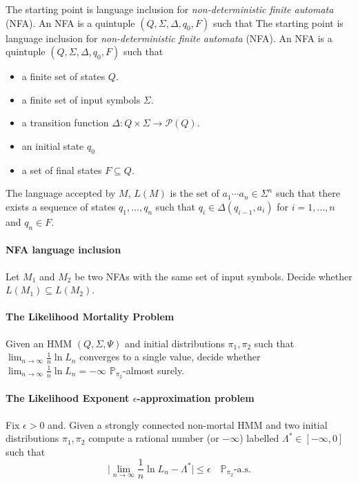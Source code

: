 \documentclass[a4paper,UKenglish,cleveref, autoref,mathscr]{lipics-v2019}
\newcommand{\PP}{\mathbb{P}}
\newcommand{\1}{\mathbbm{1}}
\newcommand{\liexp}{\lim_{n\rightarrow\infty} \frac1n \ln L_n}
\begin{document}
The starting point is language inclusion for \emph{non-deterministic finite automata} (NFA). An NFA is a quintuple $(Q,\Sigma ,\Delta ,q_0,F)$ such that
The starting point is language inclusion for \emph{non-deterministic finite automata} (NFA). An NFA is a quintuple $(Q,\Sigma ,\Delta ,q_0,F)$ such that
\begin{itemize}
\item a finite set of states $Q$.
\item a finite set of input symbols $\Sigma$.
\item a transition function $\Delta : Q \times \Sigma \rightarrow \mathscr{P}(Q)$.
\item an initial state $q_0$
\item a set of final states $F \subseteq Q$.
\end{itemize}
The language accepted by $M$, $L(M)$ is the set of $a_1\cdots a_n \in \Sigma^n$ such that there exists a sequence of states $q_1, \dots, q_n$ such that $q_i \in \Delta (q_{i - 1}, a_i)$ for $i = 1, \dots, n$ and $q_n \in F$.

\paragraph*{NFA language inclusion\\}
Let $M_1$ and $M_2$ be two NFAs with the same set of input symbols. Decide whether $L(M_1) \subseteq L(M_2)$.

\paragraph*{The Likelihood Mortality Problem\\}
Given an HMM $(Q, \Sigma, \Psi)$ and initial distributions $\pi_1, \pi_2$ such that $\liexp$ converges to a single value, decide whether $\liexp = -\infty$ $\PP_{\pi_2}$-almost surely.

\paragraph*{The Likelihood Exponent $\epsilon$-approximation problem\\}
Fix $\epsilon > 0$ and. Given a strongly connected non-mortal HMM and two initial distributions $\pi_1, \pi_2$ compute a rational number (or $-\infty$) labelled $\Lambda^* \in [-\infty, 0]$ such that
\begin{equation*}
\big\lvert \liexp - \Lambda^* \big\rvert \leq \epsilon \quad \PP_{\pi_2}\text{-a.s.}
\end{equation*}
\end{document}
